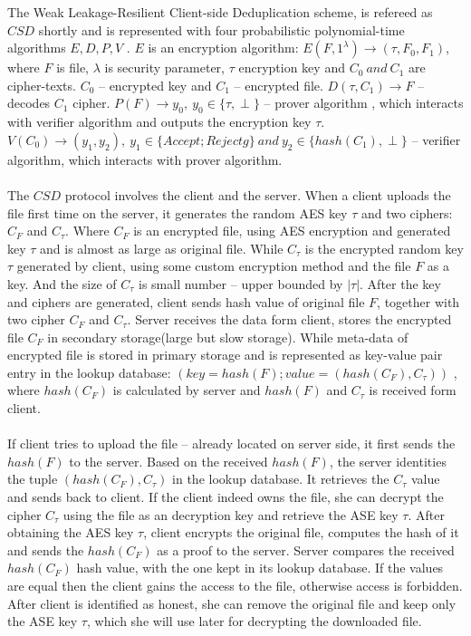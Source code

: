 \documentclass[12pt]{article}
\begin{document}
The Weak Leakage-Resilient Client-side Deduplication scheme, is refereed as $CSD$ shortly and is represented with four probabilistic polynomial-time algorithms $E, D, P, V$ .  $E$ is an encryption algorithm: $E(F,1^\lambda) 	\rightarrow (\tau, F_0, F_1)$, where $F$ is file, $\lambda$ is security parameter, $\tau$ encryption key and $C_0\ and\ C_1$ are cipher-texts. $C_0$ -- encrypted key and $C_1$ -- encrypted file. $D(\tau,C_1) \rightarrow F $ -- decodes $C_1$ cipher. $P(F) \rightarrow y_0,\  y_0 \in \{\tau,\perp\} $ -- prover algorithm , which interacts with verifier algorithm and outputs the encryption key $\tau$. $V(C_0) \rightarrow (y_1,y_2),\ y_1 \in \{Accept; Rejectg\}\ and\ y_2 \in \{hash(C_1),\perp \}$ -- verifier algorithm, which interacts with prover algorithm.\\\\
The $CSD$ protocol involves the client and the server. When a client uploads the file first time on the server, it generates the random AES\cite{AES} key $\tau$ and two ciphers: $C_F$ and $C_\tau$. Where $C_F$ is an encrypted file, using AES encryption and generated  key $\tau$  and is almost as large as original file. While  $C_\tau$ is the encrypted random key $\tau$ generated by client, using some custom encryption method and the file $F$ as a key. And the size of $C_\tau$ is small number -- upper bounded by $|\tau|$. After the key and ciphers are generated, client sends hash value of original file $F$, together with two cipher $C_F$ and $C_\tau$.  Server receives the data form client, stores the encrypted file $C_F$ in secondary storage(large but slow storage). While meta-data of encrypted file is stored in primary storage and is represented as key-value pair entry in the lookup database: $(key = hash(F); value = (hash(C_F), C_\tau))$ , where $hash(C_F)$ is calculated by server and $hash(F)$ and $C_\tau$ is received form client.\\\\
If client tries to upload the file -- already located on server side, it first sends the $hash(F)$ to the server.  Based on the received $hash(F)$, the server identities  the tuple $(hash(C_F),C_\tau)$ in the lookup database. It retrieves the $C_\tau$ value and sends back to client. If the client indeed owns the file, she can decrypt the cipher $C_\tau$ using the file as an decryption key and retrieve the ASE key $\tau$. After obtaining the AES key $\tau$, client encrypts the original file, computes the hash of it and sends the $hash(C_F)$ as a proof to the server. Server compares the received $hash(C_F)$ hash value, with the one kept in its lookup database. If the values are equal then the client gains the access to the file, otherwise access is forbidden. After client is identified as honest, she can remove the original file and keep only the ASE key $\tau$, which she will use later for decrypting the downloaded file.\\\\
\end{document}
